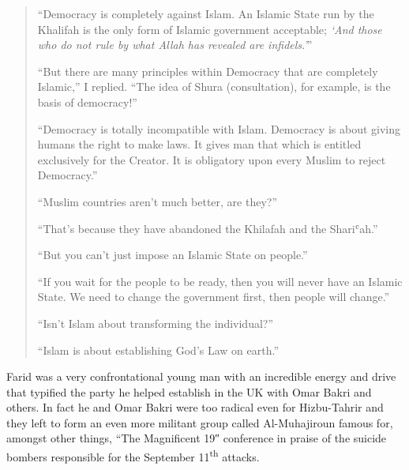 \documentclass[12pt]{memoir}
\def\`{ʿ} %
\let \Sup=\textsuperscript
\begin{document}
\begin{quote}
“Democracy is completely against Islam.
An Islamic State run by the Khalifah
is the only form of Islamic government acceptable;
\emph{‘And those who do not rule by what Allah has revealed are infidels.’}”

“But there are many principles within Democracy
that are completely Islamic,” I replied.
“The idea of Shura (consultation), for example, is the basis of democracy!”

“Democracy is totally incompatible with Islam.
Democracy is about giving humans the right to make laws.
It gives man that which is entitled exclusively for the Creator.
It is obligatory upon every Muslim to reject Democracy.”

“Muslim countries aren’t much better, are they?”

“That’s because they have abandoned the Khilafah and the Shari\`ah.”

“But you can’t just impose an Islamic State on people.”

“If you wait for the people to be ready,
then you will never have an Islamic State.
We need to change the government first, then people will change.”

“Isn’t Islam about transforming the individual?”

“Islam is about establishing God’s Law on earth.”
\end{quote}

Farid was a very confrontational young man with an incredible energy
and drive that typified the party he helped establish
in the UK with Omar Bakri and others.
In fact he and Omar Bakri were too radical even for Hizbu-Tahrir
and they left to form an even more militant group
called Al-Muhajiroun famous for, amongst other things,
“The Magnificent 19″ conference in praise of the suicide bombers
responsible for the September 11\Sup{th} attacks.
\end{document}
